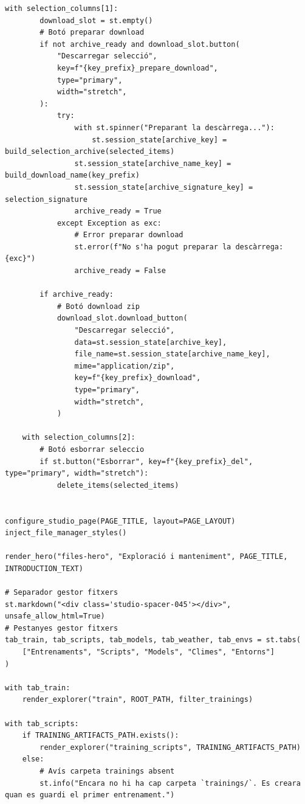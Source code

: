 \documentclass[10pt,a4paper]{article}
\begin{document}
\begin{lstlisting}[style=studioPython,caption={pages/Gestionar\_Arxius.py},label={lst:pages-gestionar-arxius-py}]
    with selection_columns[1]:
        download_slot = st.empty()
        # Botó preparar download
        if not archive_ready and download_slot.button(
            "Descarregar selecció",
            key=f"{key_prefix}_prepare_download",
            type="primary",
            width="stretch",
        ):
            try:
                with st.spinner("Preparant la descàrrega..."):
                    st.session_state[archive_key] = build_selection_archive(selected_items)
                st.session_state[archive_name_key] = build_download_name(key_prefix)
                st.session_state[archive_signature_key] = selection_signature
                archive_ready = True
            except Exception as exc:
                # Error preparar download
                st.error(f"No s'ha pogut preparar la descàrrega: {exc}")
                archive_ready = False

        if archive_ready:
            # Botó download zip
            download_slot.download_button(
                "Descarregar selecció",
                data=st.session_state[archive_key],
                file_name=st.session_state[archive_name_key],
                mime="application/zip",
                key=f"{key_prefix}_download",
                type="primary",
                width="stretch",
            )

    with selection_columns[2]:
        # Botó esborrar seleccio
        if st.button("Esborrar", key=f"{key_prefix}_del", type="primary", width="stretch"):
            delete_items(selected_items)


configure_studio_page(PAGE_TITLE, layout=PAGE_LAYOUT)
inject_file_manager_styles()

render_hero("files-hero", "Exploració i manteniment", PAGE_TITLE, INTRODUCTION_TEXT)

# Separador gestor fitxers
st.markdown("<div class='studio-spacer-045'></div>", unsafe_allow_html=True)
# Pestanyes gestor fitxers
tab_train, tab_scripts, tab_models, tab_weather, tab_envs = st.tabs(
    ["Entrenaments", "Scripts", "Models", "Climes", "Entorns"]
)

with tab_train:
    render_explorer("train", ROOT_PATH, filter_trainings)

with tab_scripts:
    if TRAINING_ARTIFACTS_PATH.exists():
        render_explorer("training_scripts", TRAINING_ARTIFACTS_PATH)
    else:
        # Avís carpeta trainings absent
        st.info("Encara no hi ha cap carpeta `trainings/`. Es creara quan es guardi el primer entrenament.")


\end{lstlisting}
\end{document}
